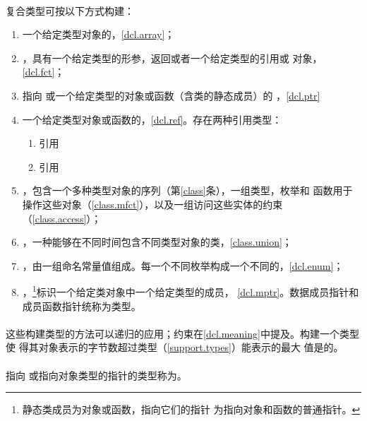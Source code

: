 \paragraph{} %
复合类型可按以下方式构建：
\begin{enumerate}
  \item 一个给定类型对象的，\ref{dcl.array}；
  \item {}，具有一个给定类型的形参，返回或者一个给定类型的引用或
        对象，\ref{dcl.fct}；
  \item 指向 或一个给定类型的对象或函数（含类的静态成员）的
        ，\ref{dcl.ptr}
  \item 一个给定类型对象或函数的，\ref{dcl.ref}。存在两种引用类型：
        \begin{enumerate}
          \item \lvalue{}引用
          \item \rvalue{}引用
        \end{enumerate}
  \item {}，包含一个多种类型对象的序列（第\ref{class}条），一组类型，枚举和
        函数用于操作这些对象（\ref{class.mfct}），以及一组访问这些实体的约束
        （\ref{class.access}）；
  \item {}，一种能够在不同时间包含不同类型对象的类，\ref{class.union}；
  \item {}，由一组命名常量值组成。每一个不同枚举构成一个不同的，\ref{dcl.enum}；
  \item {}，\footnote{静态类成员为对象或函数，指向它们的指针
        为指向对象和函数的普通指针。}标识一个给定类对象中一个给定类型的成员，
        \ref{dcl.mptr}。数据成员指针和成员函数指针统称为类型。
\end{enumerate}

\paragraph{} %
这些构建类型的方法可以递归的应用；约束在\ref{dcl.meaning}中提及。构建一个类型使
得其对象表示的字节数超过类型（\ref{support.types}）能表示的最大
值是\illform{}的。

\paragraph{} %
指向 或指向对象类型的指针的类型称为。

